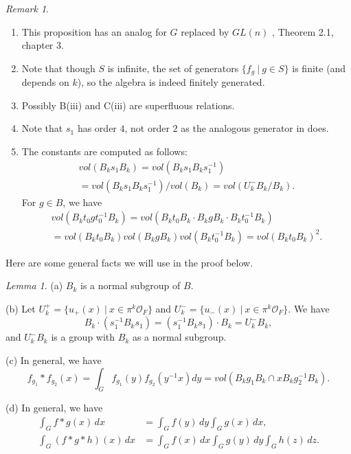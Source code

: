 \documentclass[12pt,letterpaper]{amsart}
\theoremstyle{definition}
\theoremstyle{remark}
\newtheorem{lemma}[theorem]{Lemma}
\newtheorem{remark}{Remark}
\begin{document}
\begin{remark} 

{\it 
\begin{enumerate}

\item
This proposition has an analog for $G$ replaced by 
$GL(n)$ \cite{H}, Theorem 2.1, chapter 3. 

\item
Note that though $S$ is infinite, the set of
generators $\{f_g\ |\ g\in S\}$ is finite (and depends on
$k$), so the algebra is indeed finitely generated.

\item
 Possibly B(iii) and C(iii) are superfluous relations. 

\item
 Note that $s_1$ has order $4$, not order $2$ as the analogous
generator in \cite{H} does.

\item
 The constants are computed as follows:
\[
\begin{array}{c}
vol(B_k s_1 B_k)=
vol(B_k s_1 B_ks_1^{-1})\\
=vol(B_k s_1 B_ks_1^{-1})/vol(B_k)
=vol(U_k^- B_k/B_k).
\end{array}
\]
For $g\in B$, we have
\[
\begin{array}{c}
vol(B_k t_0gt_0^{-1}B_k)
=vol(B_k t_0B_k\cdot B_kgB_k\cdot B_kt_0^{-1}B_k)\\
=vol(B_k t_0B_k)vol(B_kgB_k)vol(B_kt_0^{-1}B_k)
=vol(B_k t_0B_k)^2.
\end{array}
\]
\end{enumerate}
} 
\end{remark}

Here are some general facts we will use in the proof below.

\begin{lemma} (a) $B_k$ is a normal subgroup of $B$.

(b) Let $U^+_k=\{u_+(x)\ |\ x\in \pi^k\mathcal{O}_F\}$
and $U^-_k=\{u_-(x)\ |\ x\in \pi^k\mathcal{O}_F\}$.
We have
\[
B_k\cdot (s_1^{-1}B_ks_1)
=(s_1^{-1}B_ks_1)\cdot B_k=U^-_kB_k,
\]
and $U^-_kB_k$ is a group with $B_k$ as a normal subgroup.

(c) In general, we have
\[
f_{g_1}*f_{g_2}(x)=\int_G f_{g_1}(y)f_{g_2}(y^{-1}x)dy
=vol(B_kg_1B_k\cap xB_kg_2^{-1}B_k).
\]

(d) In general, we have
\[
\begin{aligned}
\int_G f*g(x)\,dx
&=\int_G f(y)\,dy\int_G g(x)\,dx,\\
\int_G (f*g*h)(x)\,dx
&=\int_G f(x)\,dx\int_G g(y)\,dy\int_G h(z)\,dz.
\end{aligned}
\]
\label{lemma:9}
\end{lemma}
\end{document}
